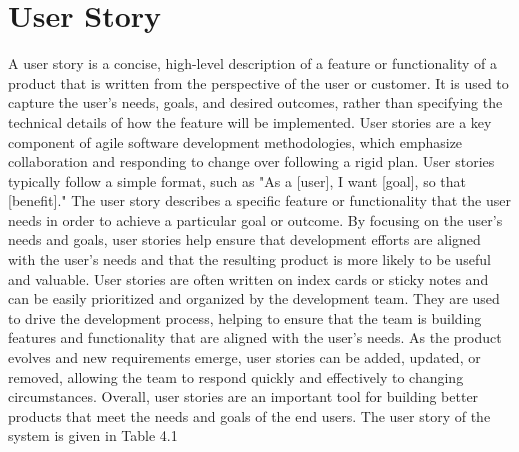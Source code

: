 \documentclass[12pt]{report}
\begin{document}

\section{User Story}

A user story is a concise, high-level description of a feature or functionality of a product that is written from the perspective of the user or customer. It is used to capture the user's needs, goals, and desired outcomes, rather than specifying the technical details of how the feature will be implemented. User stories are a key component of agile software development methodologies, which emphasize collaboration and responding to change over following a rigid plan.\newline \newline
User stories typically follow a simple format, such as "As a [user], I want [goal], so that [benefit]." The user story describes a specific feature or functionality that the user needs in order to achieve a particular goal or outcome. By focusing on the user's needs and goals, user stories help ensure that development efforts are aligned with the user's needs and that the resulting product is more likely to be useful and valuable.\newline \newline
User stories are often written on index cards or sticky notes and can be easily prioritized and organized by the development team. They are used to drive the development process, helping to ensure that the team is building features and functionality that are aligned with the user's needs. As the product evolves and new requirements emerge, user stories can be added, updated, or removed, allowing the team to respond quickly and effectively to changing circumstances. Overall, user stories are an important tool for building better products that meet the needs and goals of the end users. The user story of the system is given in Table 4.1
\end{document}
